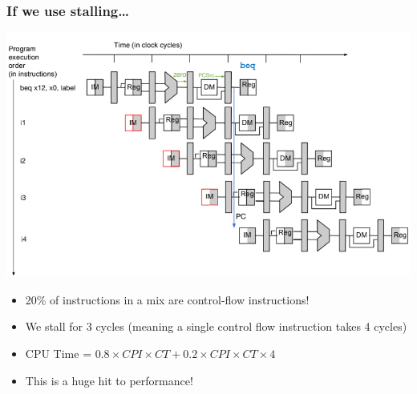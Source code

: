 \documentclass[10pt]{article}
\begin{document}
\subsubsection*{If we use stalling\dots}
\begin{center}
    \includegraphics*[scale=0.6]{W3_16.png}
\end{center}
\begin{itemize}
    \item 20\% of instructions in a mix are control-flow instructions!
    \item We stall for 3 cycles (meaning a single control flow instruction takes 4 cycles)
    \item CPU Time = $0.8 \times CPI \times CT + 0.2 \times CPI \times CT \times 4$
    \item This is a huge hit to performance!
\end{itemize}
\end{document}
